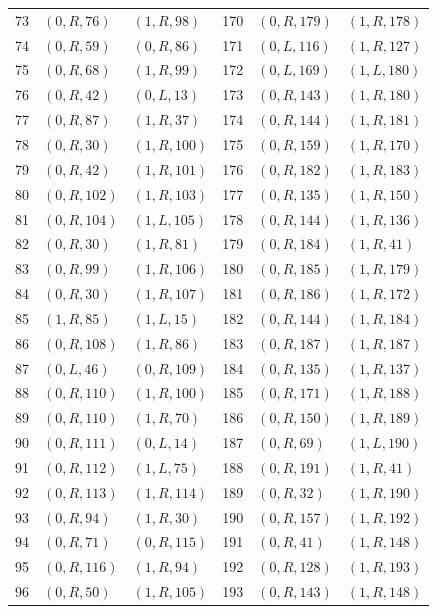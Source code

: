 \begin{longtable}{rll@{\qquad\qquad}rll}
73 & $(0,R,76)$ & $(1,R,98)$ & 170 & $(0,R,179)$ & $(1,R,178)$\\
74 & $(0,R,59)$ & $(0,R,86)$ & 171 & $(0,L,116)$ & $(1,R,127)$\\
75 & $(0,R,68)$ & $(1,R,99)$ & 172 & $(0,L,169)$ & $(1,L,180)$\\
76 & $(0,R,42)$ & $(0,L,13)$ & 173 & $(0,R,143)$ & $(1,R,180)$\\
77 & $(0,R,87)$ & $(1,R,37)$ & 174 & $(0,R,144)$ & $(1,R,181)$\\
78 & $(0,R,30)$ & $(1,R,100)$ & 175 & $(0,R,159)$ & $(1,R,170)$\\
79 & $(0,R,42)$ & $(1,R,101)$ & 176 & $(0,R,182)$ & $(1,R,183)$\\
80 & $(0,R,102)$ & $(1,R,103)$ & 177 & $(0,R,135)$ & $(1,R,150)$\\
81 & $(0,R,104)$ & $(1,L,105)$ & 178 & $(0,R,144)$ & $(1,R,136)$\\
82 & $(0,R,30)$ & $(1,R,81)$ & 179 & $(0,R,184)$ & $(1,R,41)$\\
83 & $(0,R,99)$ & $(1,R,106)$ & 180 & $(0,R,185)$ & $(1,R,179)$\\
84 & $(0,R,30)$ & $(1,R,107)$ & 181 & $(0,R,186)$ & $(1,R,172)$\\
85 & $(1,R,85)$ & $(1,L,15)$ & 182 & $(0,R,144)$ & $(1,R,184)$\\
86 & $(0,R,108)$ & $(1,R,86)$ & 183 & $(0,R,187)$ & $(1,R,187)$\\
87 & $(0,L,46)$ & $(0,R,109)$ & 184 & $(0,R,135)$ & $(1,R,137)$\\
88 & $(0,R,110)$ & $(1,R,100)$ & 185 & $(0,R,171)$ & $(1,R,188)$\\
89 & $(0,R,110)$ & $(1,R,70)$ & 186 & $(0,R,150)$ & $(1,R,189)$\\
90 & $(0,R,111)$ & $(0,L,14)$ & 187 & $(0,R,69)$ & $(1,L,190)$\\
91 & $(0,R,112)$ & $(1,L,75)$ & 188 & $(0,R,191)$ & $(1,R,41)$\\
92 & $(0,R,113)$ & $(1,R,114)$ & 189 & $(0,R,32)$ & $(1,R,190)$\\
93 & $(0,R,94)$ & $(1,R,30)$ & 190 & $(0,R,157)$ & $(1,R,192)$\\
94 & $(0,R,71)$ & $(0,R,115)$ & 191 & $(0,R,41)$ & $(1,R,148)$\\
95 & $(0,R,116)$ & $(1,R,94)$ & 192 & $(0,R,128)$ & $(1,R,193)$\\
96 & $(0,R,50)$ & $(1,R,105)$ & 193 & $(0,R,143)$ & $(1,R,148)$\\
\bottomrule\end{longtable}
\endgroup
